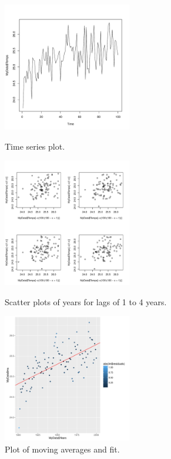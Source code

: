 \documentclass[a4paper]{article}
\begin{document}
\begin{figure}

\centering
\includegraphics[width=0.5\textwidth]{TAutocorrtimeseries1.pdf}
\caption{\label{fig:TAutocorrtimeseries1.pdf}Time series plot.}

\centering
\includegraphics[width=0.5\textwidth]{TAutocorrtimeseries2.pdf}
\caption{\label{fig:TAutocorrtimeseries2.pdf}Scatter plots of years for lags of 1 to 4 years.}

\centering
\includegraphics[width=0.5\textwidth]{TAutocorrmovingavg.pdf}
\caption{\label{fig:TAutocorrmovingavg.pdf}Plot of moving averages and fit.}
\end{figure}
\end{document}
